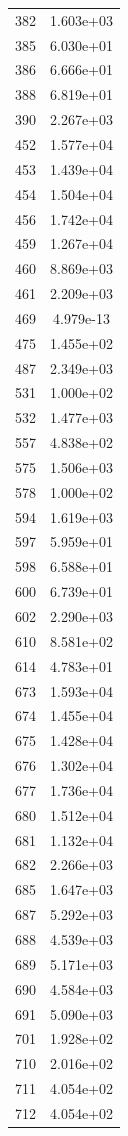 \documentclass[12pt]{article}
\begin{document}
\begin{longtable}{@{}cc@{}}
382 & 1.603e+03 \\
385 & 6.030e+01 \\
386 & 6.666e+01 \\
388 & 6.819e+01 \\
390 & 2.267e+03 \\
452 & 1.577e+04 \\
453 & 1.439e+04 \\
454 & 1.504e+04 \\
456 & 1.742e+04 \\
459 & 1.267e+04 \\
460 & 8.869e+03 \\
461 & 2.209e+03 \\
469 & 4.979e-13 \\
475 & 1.455e+02 \\
487 & 2.349e+03 \\
531 & 1.000e+02 \\
532 & 1.477e+03 \\
557 & 4.838e+02 \\
575 & 1.506e+03 \\
578 & 1.000e+02 \\
594 & 1.619e+03 \\
597 & 5.959e+01 \\
598 & 6.588e+01 \\
600 & 6.739e+01 \\
602 & 2.290e+03 \\
610 & 8.581e+02 \\
614 & 4.783e+01 \\
673 & 1.593e+04 \\
674 & 1.455e+04 \\
675 & 1.428e+04 \\
676 & 1.302e+04 \\
677 & 1.736e+04 \\
680 & 1.512e+04 \\
681 & 1.132e+04 \\
682 & 2.266e+03 \\
685 & 1.647e+03 \\
687 & 5.292e+03 \\
688 & 4.539e+03 \\
689 & 5.171e+03 \\
690 & 4.584e+03 \\
691 & 5.090e+03 \\
701 & 1.928e+02 \\
710 & 2.016e+02 \\
711 & 4.054e+02 \\
712 & 4.054e+02 \\

\end{longtable}
\end{document}
